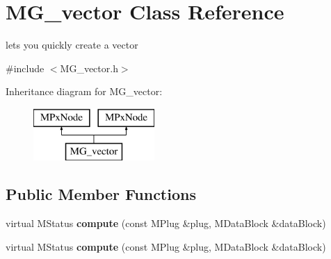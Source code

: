 \hypertarget{class_m_g__vector}{\section{M\-G\-\_\-vector Class Reference}
\label{class_m_g__vector}
}


lets you quickly create a vector  




{\ttfamily \#include $<$M\-G\-\_\-vector.\-h$>$}

Inheritance diagram for M\-G\-\_\-vector\-:\begin{figure}[H]
\begin{center}
\leavevmode
\includegraphics[height=2.000000cm]{class_m_g__vector}
\end{center}
\end{figure}
\subsection*{Public Member Functions}
\begin{DoxyCompactItemize}
\item 
\hypertarget{class_m_g__vector_a8da2ac463306acc395900f2b5d2402d7}{virtual M\-Status {\bfseries compute} (const M\-Plug \&plug, M\-Data\-Block \&data\-Block)}\label{class_m_g__vector_a8da2ac463306acc395900f2b5d2402d7}

\item 
\hypertarget{class_m_g__vector_a8da2ac463306acc395900f2b5d2402d7}{virtual M\-Status {\bfseries compute} (const M\-Plug \&plug, M\-Data\-Block \&data\-Block)}\label{class_m_g__vector_a8da2ac463306acc395900f2b5d2402d7}

\end{DoxyCompactItemize}
